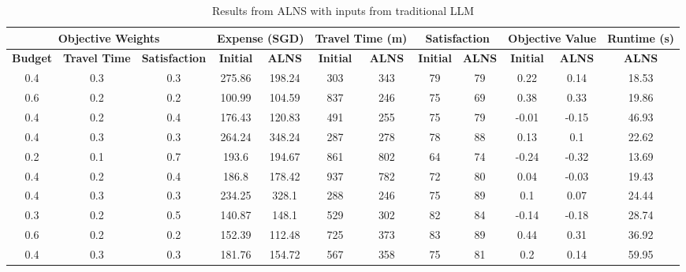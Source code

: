\documentclass{ecai}
\begin{document}
\begin{table}[htbp]
    \centering
    \begin{adjustbox}{width=0.48\textwidth}
    \begin{tabular}{|c|c|c|c|c|c|c|c|c|c|c|c|}
         \hline
         \multicolumn{3}{|c|}{\textbf{Objective Weights}} & \multicolumn{2}{c|}{\textbf{Expense (SGD)}} & \multicolumn{2}{c|}{\textbf{Travel Time (m)}} & \multicolumn{2}{c|}{\textbf{Satisfaction}} & \multicolumn{2}{c|}{\textbf{Objective Value}} & \textbf{Runtime (s)} \\
         \hline
         \textbf{Budget} & \textbf{Travel Time} & \textbf{Satisfaction} & \textbf{Initial} & \textbf{ALNS} & \textbf{Initial} & \textbf{ALNS} & \textbf{Initial} & \textbf{ALNS} & \textbf{Initial} & \textbf{ALNS} & \textbf{ALNS} \\
         \hline
         0.4 & 0.3 & 0.3 & 275.86 & 198.24 & 303 & 343 & 79 & 79 & 0.22 & 0.14 & 18.53 \\
         0.6 & 0.2 & 0.2 & 100.99 & 104.59 & 837 & 246 & 75 & 69 & 0.38 & 0.33 & 19.86 \\
         0.4 & 0.2 & 0.4 & 176.43 & 120.83 & 491 & 255 & 75 & 79 & -0.01 & -0.15 & 46.93 \\
         0.4 & 0.3 & 0.3 & 264.24 & 348.24 & 287 & 278 & 78 & 88 & 0.13 & 0.1 & 22.62 \\
         0.2 & 0.1 & 0.7 & 193.6 & 194.67 & 861 & 802 & 64 & 74 & -0.24 & -0.32 & 13.69 \\
         0.4 & 0.2 & 0.4 & 186.8 & 178.42 & 937 & 782 & 72 & 80 & 0.04 & -0.03 & 19.43 \\
         0.4 & 0.3 & 0.3 & 234.25 & 328.1 & 288 & 246 & 75 & 89 & 0.1 & 0.07 & 24.44 \\
         0.3 & 0.2 & 0.5 & 140.87 & 148.1 & 529 & 302 & 82 & 84 & -0.14 & -0.18 & 28.74 \\
         0.6 & 0.2 & 0.2 & 152.39 & 112.48 & 725 & 373 & 83 & 89 & 0.44 & 0.31 & 36.92 \\
         0.4 & 0.3 & 0.3 & 181.76 & 154.72 & 567 & 358 & 75 & 81 & 0.2 & 0.14 & 59.95 \\
         \hline
    \end{tabular}
    \end{adjustbox}
    \caption{Results from ALNS with inputs from traditional LLM}
    \label{tab:my_label}
\end{table}
\vspace{-0.3cm}
\end{document}
